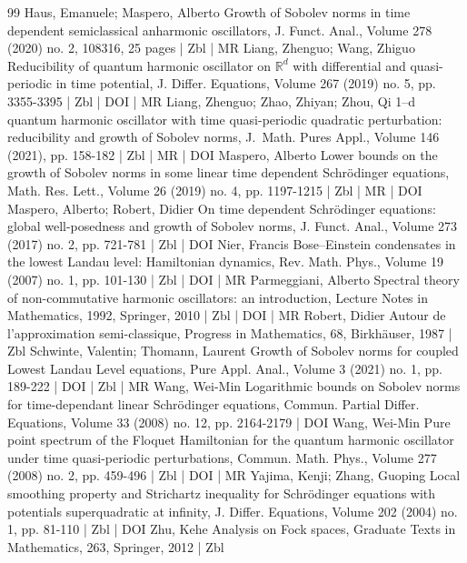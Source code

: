 \documentclass[10pt]{amsart}
\theoremstyle{definition}\newtheorem{defi}[theo]{Definition}\newtheorem{rema}[theo]{Remark}\newtheorem{exam}[theo]{Example}\newtheorem{exem}[theo]{Example}\newtheorem{nota}[theo]{Notation}
\newcommand{\<}{\langle}
\renewcommand{\>}{\rangle}
\begin{document}
\begin{thebibliography}{99}
Haus, Emanuele; Maspero, Alberto Growth of Sobolev norms in time dependent semiclassical anharmonic oscillators, J. Funct. Anal., Volume 278 (2020) no. 2, 108316, 25 pages | Zbl | MR
Liang, Zhenguo; Wang, Zhiguo Reducibility of quantum harmonic oscillator on ${\mathbb{R}}^d$ with differential and quasi-periodic in time potential, J. Differ. Equations, Volume 267 (2019) no. 5, pp. 3355-3395 | Zbl | DOI | MR
Liang, Zhenguo; Zhao, Zhiyan; Zhou, Qi 1--d quantum harmonic oscillator with time quasi-periodic quadratic perturbation: reducibility and growth of Sobolev norms, J. Math. Pures Appl., Volume 146 (2021), pp. 158-182 | Zbl | MR | DOI
Maspero, Alberto Lower bounds on the growth of Sobolev norms in some linear time dependent Schrödinger equations, Math. Res. Lett., Volume 26 (2019) no. 4, pp. 1197-1215 | Zbl | MR | DOI
Maspero, Alberto; Robert, Didier On time dependent Schrödinger equations: global well-posedness and growth of Sobolev norms, J. Funct. Anal., Volume 273 (2017) no. 2, pp. 721-781 | Zbl | DOI
Nier, Francis Bose–Einstein condensates in the lowest Landau level: Hamiltonian dynamics, Rev. Math. Phys., Volume 19 (2007) no. 1, pp. 101-130 | Zbl | DOI | MR
Parmeggiani, Alberto Spectral theory of non-commutative harmonic oscillators: an introduction, Lecture Notes in Mathematics, 1992, Springer, 2010 | Zbl | DOI | MR
Robert, Didier Autour de l’approximation semi-classique, Progress in Mathematics, 68, Birkhäuser, 1987 | Zbl
Schwinte, Valentin; Thomann, Laurent Growth of Sobolev norms for coupled Lowest Landau Level equations, Pure Appl. Anal., Volume 3 (2021) no. 1, pp. 189-222 | DOI | Zbl | MR
Wang, Wei-Min Logarithmic bounds on Sobolev norms for time-dependant linear Schrödinger equations, Commun. Partial Differ. Equations, Volume 33 (2008) no. 12, pp. 2164-2179 | DOI
Wang, Wei-Min Pure point spectrum of the Floquet Hamiltonian for the quantum harmonic oscillator under time quasi-periodic perturbations, Commun. Math. Phys., Volume 277 (2008) no. 2, pp. 459-496 | Zbl | DOI | MR
Yajima, Kenji; Zhang, Guoping Local smoothing property and Strichartz inequality for Schrödinger equations with potentials superquadratic at infinity, J. Differ. Equations, Volume 202 (2004) no. 1, pp. 81-110 | Zbl | DOI
Zhu, Kehe Analysis on Fock spaces, Graduate Texts in Mathematics, 263, Springer, 2012 | Zbl
\end{thebibliography}
\end{document}
